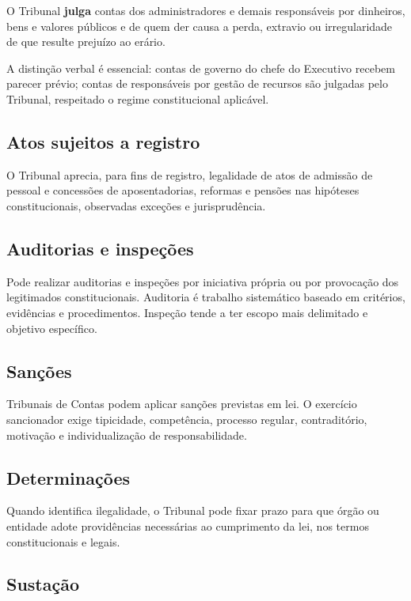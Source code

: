 O Tribunal \textbf{julga} contas dos administradores e demais responsáveis por dinheiros, bens e valores públicos e de quem der causa a perda, extravio ou irregularidade de que resulte prejuízo ao erário.

\begin{atencao}
A distinção verbal é essencial: contas de governo do chefe do Executivo recebem parecer prévio; contas de responsáveis por gestão de recursos são julgadas pelo Tribunal, respeitado o regime constitucional aplicável.
\end{atencao}

\subsection{Atos sujeitos a registro}

O Tribunal aprecia, para fins de registro, legalidade de atos de admissão de pessoal e concessões de aposentadorias, reformas e pensões nas hipóteses constitucionais, observadas exceções e jurisprudência.

\subsection{Auditorias e inspeções}

Pode realizar auditorias e inspeções por iniciativa própria ou por provocação dos legitimados constitucionais. Auditoria é trabalho sistemático baseado em critérios, evidências e procedimentos. Inspeção tende a ter escopo mais delimitado e objetivo específico.

\subsection{Sanções}

Tribunais de Contas podem aplicar sanções previstas em lei. O exercício sancionador exige tipicidade, competência, processo regular, contraditório, motivação e individualização de responsabilidade.

\subsection{Determinações}

Quando identifica ilegalidade, o Tribunal pode fixar prazo para que órgão ou entidade adote providências necessárias ao cumprimento da lei, nos termos constitucionais e legais.

\subsection{Sustação}

